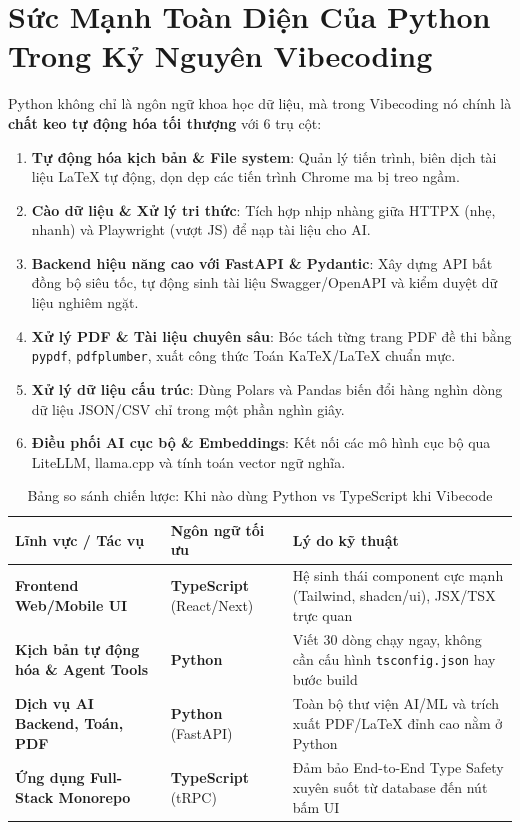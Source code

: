 \documentclass[a4paper,11pt]{article}
\begin{document}
\section{Sức Mạnh Toàn Diện Của Python Trong Kỷ Nguyên Vibecoding}

Python không chỉ là ngôn ngữ khoa học dữ liệu, mà trong Vibecoding nó chính là \textbf{chất keo tự động hóa tối thượng} với 6 trụ cột:
\begin{enumerate}[label={\arabic*.}]
    \item \textbf{Tự động hóa kịch bản \& File system}: Quản lý tiến trình, biên dịch tài liệu LaTeX tự động, dọn dẹp các tiến trình Chrome ma bị treo ngầm.
    \item \textbf{Cào dữ liệu \& Xử lý tri thức}: Tích hợp nhịp nhàng giữa HTTPX (nhẹ, nhanh) và Playwright (vượt JS) để nạp tài liệu cho AI.
    \item \textbf{Backend hiệu năng cao với FastAPI \& Pydantic}: Xây dựng API bất đồng bộ siêu tốc, tự động sinh tài liệu Swagger/OpenAPI và kiểm duyệt dữ liệu nghiêm ngặt.
    \item \textbf{Xử lý PDF \& Tài liệu chuyên sâu}: Bóc tách từng trang PDF đề thi bằng \texttt{pypdf}, \texttt{pdfplumber}, xuất công thức Toán KaTeX/LaTeX chuẩn mực.
    \item \textbf{Xử lý dữ liệu cấu trúc}: Dùng Polars và Pandas biến đổi hàng nghìn dòng dữ liệu JSON/CSV chỉ trong một phần nghìn giây.
    \item \textbf{Điều phối AI cục bộ \& Embeddings}: Kết nối các mô hình cục bộ qua LiteLLM, llama.cpp và tính toán vector ngữ nghĩa.
\end{enumerate}

\begin{table}[htbp]
\centering
\small
\caption{Bảng so sánh chiến lược: Khi nào dùng Python vs TypeScript khi Vibecode}
\vspace{0.5em}
\begin{tabularx}{\textwidth}{L{3.5cm} L{3.5cm} Y}
\toprule
\textbf{Lĩnh vực / Tác vụ} & \textbf{Ngôn ngữ tối ưu} & \textbf{Lý do kỹ thuật} \\
\midrule
\textbf{Frontend Web/Mobile UI} & \textbf{TypeScript} (React/Next) & Hệ sinh thái component cực mạnh (Tailwind, shadcn/ui), JSX/TSX trực quan \\
\textbf{Kịch bản tự động hóa \& Agent Tools} & \textbf{Python} & Viết 30 dòng chạy ngay, không cần cấu hình \texttt{tsconfig.json} hay bước build \\
\textbf{Dịch vụ AI Backend, Toán, PDF} & \textbf{Python} (FastAPI) & Toàn bộ thư viện AI/ML và trích xuất PDF/LaTeX đỉnh cao nằm ở Python \\
\textbf{Ứng dụng Full-Stack Monorepo} & \textbf{TypeScript} (tRPC) & Đảm bảo End-to-End Type Safety xuyên suốt từ database đến nút bấm UI \\
\bottomrule
\end{tabularx}
\end{table}
\end{document}
